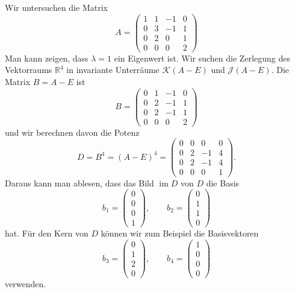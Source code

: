 \begin{beispiel}
Wir untersuchen die Matrix
\[
A
=
\begin{pmatrix}
1&1&-1&0\\
0&3&-1&1\\
0&2& 0&1\\
0&0& 0&2
\end{pmatrix}
\]
Man kann zeigen, dass $\lambda=1$ ein Eigenwert ist.
Wir suchen die Zerlegung des Vektorraums $\mathbb{R}^4$ in invariante
Unterräume $\mathcal{K}(A-E)$ und $\mathcal{J}(A-E)$.
Die Matrix $B=A-E$ ist
\[
B
=
\begin{pmatrix}
0&1&-1&0\\
0&2&-1&1\\
0&2&-1&1\\
0&0& 0&2
\end{pmatrix}
\]
und wir berechnen davon die Potenz
\[
D=B^4=(A-E)^4
=
\begin{pmatrix}
0&0& 0&0\\
0&2&-1&4\\
0&2&-1&4\\
0&0& 0&1
\end{pmatrix}.
\]
Daraus kann man ablesen, dass das Bild $\operatorname{im}D$
von $D$ die Basis
\[
b_1
=
\begin{pmatrix}
0\\0\\0\\1
\end{pmatrix}
, \qquad
b_2
=
\begin{pmatrix}
0\\1\\1\\0
\end{pmatrix}
\]
hat.
Für den Kern von $D$ können wir zum Beispiel die Basisvektoren
\[
b_3
=
\begin{pmatrix}
0\\1\\2\\0
\end{pmatrix}
,\qquad
b_4
=
\begin{pmatrix}
1\\0\\0\\0
\end{pmatrix}
\]
verwenden.


\end{beispiel}
